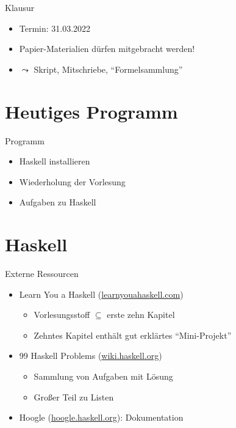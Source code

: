 \documentclass{beamer}
\begin{document}
\begin{frame}{Klausur}
        \begin{itemize}
                \item Termin: 31.03.2022
                \item Papier-Materialien dürfen mitgebracht werden!
                \item $\leadsto$ Skript, Mitschriebe, \enquote{Formelsammlung}
        \end{itemize}
\end{frame}


\section{Heutiges Programm}
\begin{frame}{Programm}
        \begin{itemize}
                \item Haskell installieren
                \item Wiederholung der Vorlesung
                \item Aufgaben zu Haskell
        \end{itemize}
\end{frame}


\section{Haskell}

\begin{frame}{Externe Ressourcen}
  \begin{itemize}
    \item Learn You a Haskell (\href{http://learnyouahaskell.com}{learnyouahaskell.com})
    \begin{itemize}
      \item Vorlesungsstoff $\subseteq$ erste zehn Kapitel
      \item Zehntes Kapitel enthält gut erklärtes \enquote{Mini-Projekt}
    \end{itemize}
    \item 99 Haskell Problems (\href{https://wiki.haskell.org/H-99:_Ninety-Nine_Haskell_Problems}{wiki.haskell.org})
    \begin{itemize}
      \item Sammlung von Aufgaben mit Lösung
      \item Großer Teil zu Listen
    \end{itemize}
    \item Hoogle (\href{https://hoogle.haskell.org}{hoogle.haskell.org}): Dokumentation
  \end{itemize}
\end{frame}
\end{document}
